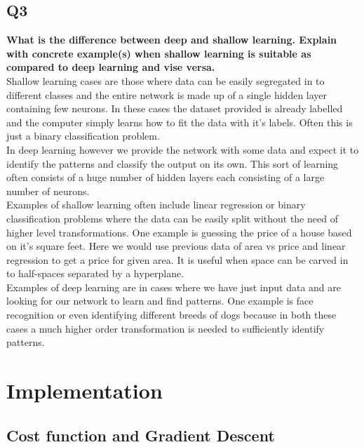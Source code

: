 \documentclass[a4paper, 12pt]{article}
\begin{document}
    \subsection{Q3}

    \textbf{What is the difference between deep and shallow learning. Explain with concrete example(s) when shallow learning is suitable as compared to deep learning and vise versa. }\\

    Shallow learning cases are those where data can be easily segregated in to different classes and the entire network is made up of a single hidden layer containing few neurons. In these cases the dataset provided is already labelled and the computer simply learns how to fit the data with it's labels. Often this is just a binary classification problem.\\

    In deep learning however we provide the network with some data and expect it to identify the patterns and classify the output on its own. This sort of learning often consists of a huge number of hidden layers each consisting of a large number of neurons.\\

    Examples of shallow learning often include linear regression or binary classification problems where the data can be easily split without the need of higher level transformations. One example is guessing the price of a house based on it's square feet. Here we would use previous data of area vs price and linear regression to get a price for given area. It is useful when space can be carved in to half-spaces separated by a hyperplane.\\

    Examples of deep learning are in cases where we have just input data and are looking for our network to learn and find patterns. One example is face recognition or even identifying different breeds of dogs because in both these cases a much higher order transformation is needed to sufficiently identify patterns.\\

    \pagebreak

    \section{Implementation}

    \subsection{Cost function and Gradient Descent}
\end{document}
